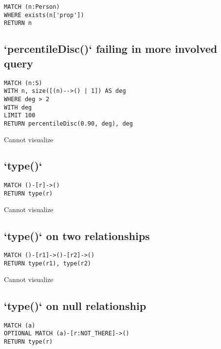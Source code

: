 \begin{lstlisting}
MATCH (n:Person)
WHERE exists(n['prop'])
RETURN n
\end{lstlisting}

\subsection{`percentileDisc()` failing in more involved query}

\begin{lstlisting}
MATCH (n:S)
WITH n, size([(n)-->() | 1]) AS deg
WHERE deg > 2
WITH deg
LIMIT 100
RETURN percentileDisc(0.90, deg), deg
\end{lstlisting}

Cannot visualize
\subsection{`type()`}

\begin{lstlisting}
MATCH ()-[r]->()
RETURN type(r)
\end{lstlisting}

Cannot visualize
\subsection{`type()` on two relationships}

\begin{lstlisting}
MATCH ()-[r1]->()-[r2]->()
RETURN type(r1), type(r2)
\end{lstlisting}

Cannot visualize
\subsection{`type()` on null relationship}

\begin{lstlisting}
MATCH (a)
OPTIONAL MATCH (a)-[r:NOT_THERE]->()
RETURN type(r)
\end{lstlisting}

